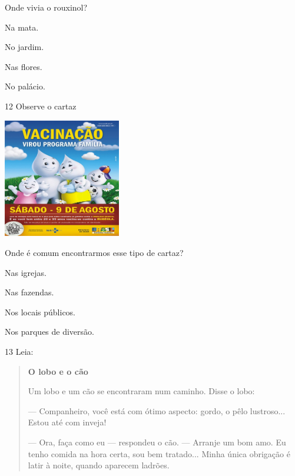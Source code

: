 
Onde vivia o rouxinol?

\begin{escolha}
\item Na mata.

\item No jardim.

\item Nas flores.

\item No palácio.
\end{escolha}


\num{12} Observe o cartaz

\includegraphics[width=2.01806in,height=2.05069in]{media/image159.jpeg}

Onde é comum encontrarmos esse tipo de cartaz?

\begin{escolha}
\item Nas igrejas.

\item Nas fazendas.

\item Nos locais públicos.

\item Nos parques de diversão.
\end{escolha}

\num{13} Leia:


\begin{quote}
\textbf{O lobo e o cão}

Um lobo e um cão se encontraram num caminho. Disse o lobo:

--- Companheiro, você está com ótimo aspecto: gordo, o pêlo lustroso...
Estou até com inveja!

--- Ora, faça como eu --- respondeu o cão. --- Arranje um bom amo.
Eu tenho comida na hora certa, sou bem tratado...
Minha única obrigação é latir à noite, quando aparecem ladrões.
\end{quote}

